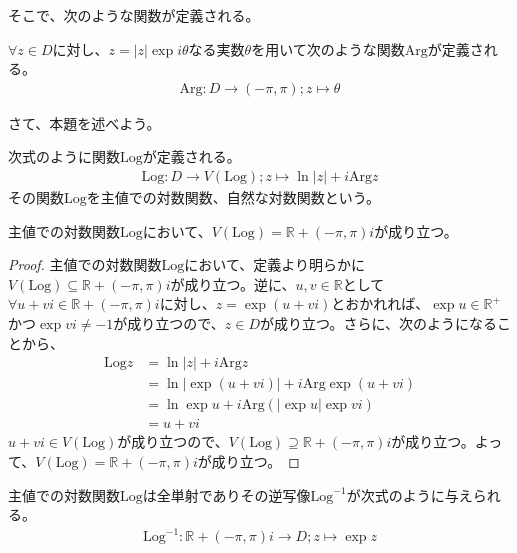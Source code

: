 \documentclass[dvipdfmx]{jsarticle}
\begin{document}
そこで、次のような関数が定義される。
\begin{dfn}
$\forall z \in D$に対し、$z = |z|\exp{i\theta}$なる実数$\theta$を用いて次のような関数$\mathrm{Arg}$が定義される。
\begin{align*}
\mathrm{Arg}:D \rightarrow ( - \pi,\pi);z \mapsto \theta
\end{align*}
\end{dfn}\par
さて、本題を述べよう。
\begin{dfn} 次式のように関数$\mathrm{Log}$が定義される。
\begin{align*}
\mathrm{Log}:D \rightarrow V(\mathrm{Log});z \mapsto \ln|z| + i\mathrm{Arg}z
\end{align*}
その関数$\mathrm{Log}$を主値での対数関数、自然な対数関数という。
\end{dfn}
\begin{thm}\label{4.3.3.3}
主値での対数関数$\mathrm{Log}$において、$V(\mathrm{Log}) = \mathbb{R} + ( - \pi,\pi)i$が成り立つ。
\end{thm}
\begin{proof}
主値での対数関数$\mathrm{Log}$において、定義より明らかに$V(\mathrm{Log}) \subseteq \mathbb{R} + ( - \pi,\pi)i$が成り立つ。逆に、$u,v \in \mathbb{R}$として$\forall u + vi \in \mathbb{R} + ( - \pi,\pi)i$に対し、$z = \exp(u + vi)$とおかれれば、$\exp u \in \mathbb{R}^{+}$かつ$\exp{vi} \neq - 1$が成り立つので、$z \in D$が成り立つ。さらに、次のようになることから、
\begin{align*}
\mathrm{Log}z &= \ln|z| + i\mathrm{Arg}z\\
&= \ln\left| \exp(u + vi) \right| + i\mathrm{Arg}{\exp(u + vi)}\\
&= \ln{\exp u} + i\mathrm{Arg}\left( \left| \exp u \right|\exp{vi} \right)\\
&= u + vi
\end{align*}
$u + vi \in V(\mathrm{Log})$が成り立つので、$V(\mathrm{Log}) \supseteq \mathbb{R} + ( - \pi,\pi)i$が成り立つ。よって、$V(\mathrm{Log}) = \mathbb{R} + ( - \pi,\pi)i$が成り立つ。
\end{proof}
\begin{thm}\label{4.3.3.4}
主値での対数関数$\mathrm{Log}$は全単射でありその逆写像$\mathrm{Log}^{- 1}$が次式のように与えられる。
\begin{align*}
\mathrm{Log}^{- 1}:\mathbb{R} + ( - \pi,\pi)i \rightarrow D;z \mapsto \exp z
\end{align*}
\end{thm}
\end{document}
